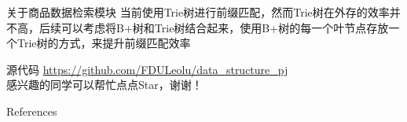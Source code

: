 \documentclass[aspectratio=169]{beamer}
\begin{document}
\begin{frame}{关于商品数据检索模块}
    当前使用Trie树进行前缀匹配，然而Trie树在外存的效率并不高，后续可以考虑将B+树和Trie树结合起来，使用B+树的每一个叶节点存放一个Trie树的方式，来提升前缀匹配效率
\end{frame}

\begin{frame}{源代码}
    \url{https://github.com/FDULeolu/data_structure_pj}
    \\
    感兴趣的同学可以帮忙点点Star，谢谢！
\end{frame}


\begin{frame}{References}
    \tiny
    
\end{frame}
\end{document}
